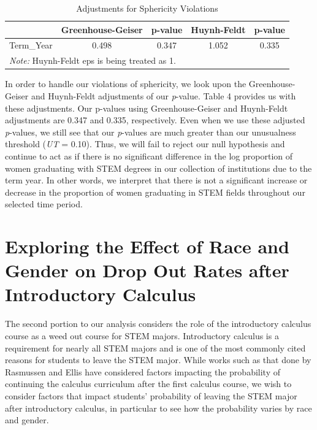 \documentclass[]{article}
\begin{document}
\begin{table}[H]

\caption{\label{tab:sphericityAdjustments}Adjustments for Sphericity Violations}
\centering
\fontsize{12}{14}\selectfont
\begin{tabular}[t]{l|c|c|c|c}
\hline
  & Greenhouse-Geiser & p-value & Huynh-Feldt & p-value\\
\hline
Term\_Year & 0.498 & 0.347 & 1.052 & 0.335\\
\hline
\multicolumn{5}{l}{\textit{Note: } Huynh-Feldt eps is being treated as 1.}\\
\end{tabular}
\end{table}

In order to handle our violations of sphericity, we look upon the
Greenhouse-Geiser and Huynh-Feldt adjustments of our \emph{p}-value.
Table 4 provides us with these adjustments. Our p-values using
Greenhouse-Geiser and Huynh-Feldt adjustments are 0.347 and 0.335,
respectively. Even when we use these adjusted \emph{p}-values, we still
see that our \emph{p}-values are much greater than our unusualness
threshold (\emph{UT} = 0.10). Thus, we will fail to reject our null
hypothesis and continue to act as if there is no significant difference
in the log proportion of women graduating with STEM degrees in our
collection of institutions due to the term year. In other words, we
interpret that there is not a significant increase or decrease in the
proportion of women graduating in STEM fields throughout our selected
time period.

\section{Exploring the Effect of Race and Gender on Drop Out Rates after
Introductory
Calculus}\label{exploring-the-effect-of-race-and-gender-on-drop-out-rates-after-introductory-calculus}

The second portion to our analysis considers the role of the
introductory calculus course as a weed out course for STEM majors.
Introductory calculus is a requirement for nearly all STEM majors and is
one of the most commonly cited reasons for students to leave the STEM
major. \cite{paper} While works such as that done by Rasmussen and Ellis
have considered factors impacting the probability of continuing the
calculus curriculum after the first calculus course, we wish to consider
factors that impact students' probability of leaving the STEM major
after introductory calculus, in particular to see how the probability
varies by race and gender.
\end{document}
